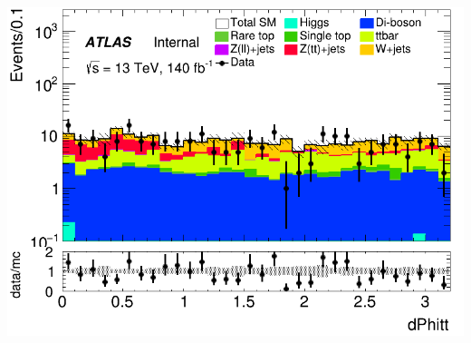 \documentclass[usenames,dvipsnames]{beamer}
\begin{document}
\begin{frame}
\begin{minipage}{0.32\textwidth}
        \includegraphics[width=\textwidth]{graphics/LHH_met/LHH_met_dPhitt.png}
    \end{minipage}
\end{frame}
\end{document}

